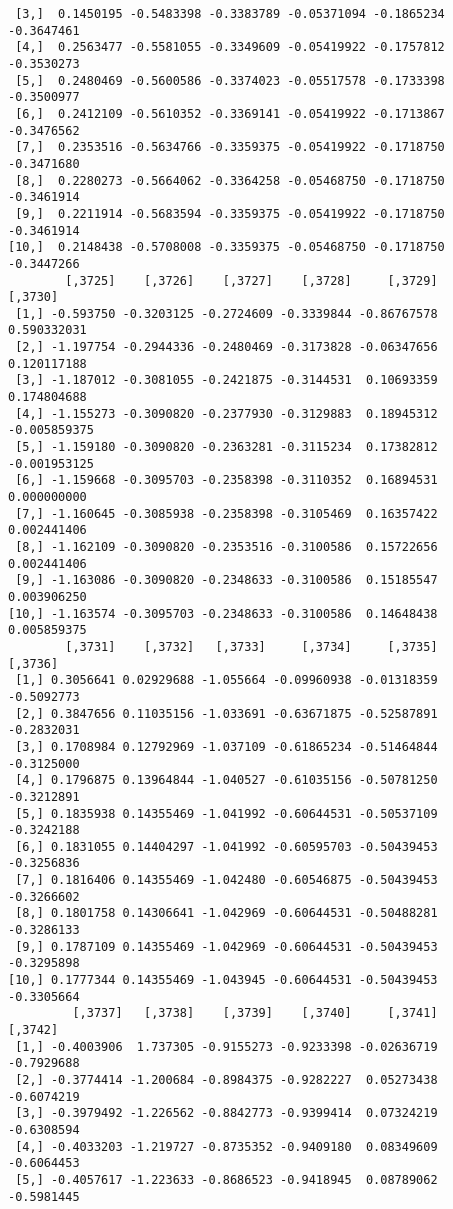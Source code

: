 \documentclass[
  letterpaper,
  DIV=11,
  numbers=noendperiod]{scrreprt}
\begin{document}
\begin{verbatim}
 [3,]  0.1450195 -0.5483398 -0.3383789 -0.05371094 -0.1865234 -0.3647461
 [4,]  0.2563477 -0.5581055 -0.3349609 -0.05419922 -0.1757812 -0.3530273
 [5,]  0.2480469 -0.5600586 -0.3374023 -0.05517578 -0.1733398 -0.3500977
 [6,]  0.2412109 -0.5610352 -0.3369141 -0.05419922 -0.1713867 -0.3476562
 [7,]  0.2353516 -0.5634766 -0.3359375 -0.05419922 -0.1718750 -0.3471680
 [8,]  0.2280273 -0.5664062 -0.3364258 -0.05468750 -0.1718750 -0.3461914
 [9,]  0.2211914 -0.5683594 -0.3359375 -0.05419922 -0.1718750 -0.3461914
[10,]  0.2148438 -0.5708008 -0.3359375 -0.05468750 -0.1718750 -0.3447266
        [,3725]    [,3726]    [,3727]    [,3728]     [,3729]      [,3730]
 [1,] -0.593750 -0.3203125 -0.2724609 -0.3339844 -0.86767578  0.590332031
 [2,] -1.197754 -0.2944336 -0.2480469 -0.3173828 -0.06347656  0.120117188
 [3,] -1.187012 -0.3081055 -0.2421875 -0.3144531  0.10693359  0.174804688
 [4,] -1.155273 -0.3090820 -0.2377930 -0.3129883  0.18945312 -0.005859375
 [5,] -1.159180 -0.3090820 -0.2363281 -0.3115234  0.17382812 -0.001953125
 [6,] -1.159668 -0.3095703 -0.2358398 -0.3110352  0.16894531  0.000000000
 [7,] -1.160645 -0.3085938 -0.2358398 -0.3105469  0.16357422  0.002441406
 [8,] -1.162109 -0.3090820 -0.2353516 -0.3100586  0.15722656  0.002441406
 [9,] -1.163086 -0.3090820 -0.2348633 -0.3100586  0.15185547  0.003906250
[10,] -1.163574 -0.3095703 -0.2348633 -0.3100586  0.14648438  0.005859375
        [,3731]    [,3732]   [,3733]     [,3734]     [,3735]    [,3736]
 [1,] 0.3056641 0.02929688 -1.055664 -0.09960938 -0.01318359 -0.5092773
 [2,] 0.3847656 0.11035156 -1.033691 -0.63671875 -0.52587891 -0.2832031
 [3,] 0.1708984 0.12792969 -1.037109 -0.61865234 -0.51464844 -0.3125000
 [4,] 0.1796875 0.13964844 -1.040527 -0.61035156 -0.50781250 -0.3212891
 [5,] 0.1835938 0.14355469 -1.041992 -0.60644531 -0.50537109 -0.3242188
 [6,] 0.1831055 0.14404297 -1.041992 -0.60595703 -0.50439453 -0.3256836
 [7,] 0.1816406 0.14355469 -1.042480 -0.60546875 -0.50439453 -0.3266602
 [8,] 0.1801758 0.14306641 -1.042969 -0.60644531 -0.50488281 -0.3286133
 [9,] 0.1787109 0.14355469 -1.042969 -0.60644531 -0.50439453 -0.3295898
[10,] 0.1777344 0.14355469 -1.043945 -0.60644531 -0.50439453 -0.3305664
         [,3737]   [,3738]    [,3739]    [,3740]     [,3741]    [,3742]
 [1,] -0.4003906  1.737305 -0.9155273 -0.9233398 -0.02636719 -0.7929688
 [2,] -0.3774414 -1.200684 -0.8984375 -0.9282227  0.05273438 -0.6074219
 [3,] -0.3979492 -1.226562 -0.8842773 -0.9399414  0.07324219 -0.6308594
 [4,] -0.4033203 -1.219727 -0.8735352 -0.9409180  0.08349609 -0.6064453
 [5,] -0.4057617 -1.223633 -0.8686523 -0.9418945  0.08789062 -0.5981445

\end{verbatim}
\end{document}
